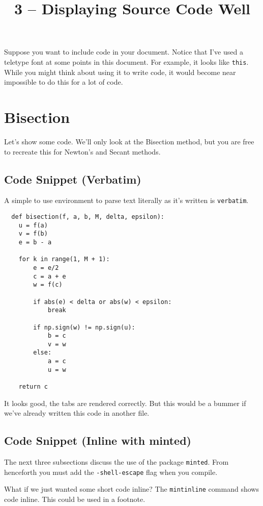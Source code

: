 \documentclass{article}
\title{3 -- Displaying Source Code Well}
\begin{document}
\maketitle

Suppose you want to include code in your document. Notice that
I've used a teletype font at some points in this document.
For example, it looks like \texttt{this}. While you might think
about using it to write code, it would become near impossible
to do this for a lot of code.

\section{Bisection}

Let's show some code. We'll only look at the Bisection method, but you
are free to recreate this for Newton's and Secant methods.

\subsection{Code Snippet (Verbatim)}

A simple to use environment to parse text literally as it's written is \texttt{verbatim}.

\begin{verbatim}
  def bisection(f, a, b, M, delta, epsilon):
    u = f(a)
    v = f(b)
    e = b - a

    for k in range(1, M + 1):
        e = e/2
        c = a + e
        w = f(c)

        if abs(e) < delta or abs(w) < epsilon:
            break

        if np.sign(w) != np.sign(u):
            b = c
            v = w
        else:
            a = c
            u = w

    return c
\end{verbatim}

It looks good, the tabs are rendered correctly. But this would be a bummer
if we've already written this code in another file.

\subsection{Code Snippet (Inline with minted)}

The next three subsections discuss the use of the package \texttt{minted}.
From henceforth you must add the \texttt{-shell-escape} flag when you compile.

What if we just wanted some short code inline? The \texttt{mintinline} command
shows code inline. This could be used in a footnote.
\end{document}
